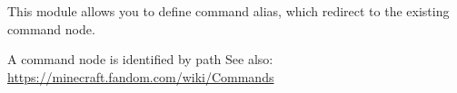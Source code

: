 
This module allows you to define command alias, which redirect to the existing command node.

\begin{note}{A command node is identified by path}
   See also: \url{https://minecraft.fandom.com/wiki/Commands}
\end{note}
